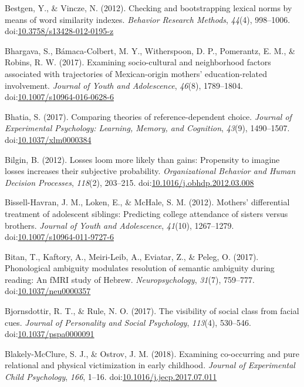 \documentclass[english,man]{apa6}
\theoremstyle{definition}
\theoremstyle{definition}
\theoremstyle{definition}
\theoremstyle{remark}
\begin{document}
\hypertarget{ref-Bestgen2012}{}
Bestgen, Y., \& Vincze, N. (2012). Checking and bootstrapping lexical
norms by means of word similarity indexes. \emph{Behavior Research
Methods}, \emph{44}(4), 998--1006.
doi:\href{https://doi.org/10.3758/s13428-012-0195-z}{10.3758/s13428-012-0195-z}

\hypertarget{ref-Bhargava2017}{}
Bhargava, S., Bámaca-Colbert, M. Y., Witherspoon, D. P., Pomerantz, E.
M., \& Robins, R. W. (2017). Examining socio-cultural and neighborhood
factors associated with trajectories of Mexican-origin mothers'
education-related involvement. \emph{Journal of Youth and Adolescence},
\emph{46}(8), 1789--1804.
doi:\href{https://doi.org/10.1007/s10964-016-0628-6}{10.1007/s10964-016-0628-6}

\hypertarget{ref-Bhatia2017}{}
Bhatia, S. (2017). Comparing theories of reference-dependent choice.
\emph{Journal of Experimental Psychology: Learning, Memory, and
Cognition}, \emph{43}(9), 1490--1507.
doi:\href{https://doi.org/10.1037/xlm0000384}{10.1037/xlm0000384}

\hypertarget{ref-Bilgin2012}{}
Bilgin, B. (2012). Losses loom more likely than gains: Propensity to
imagine losses increases their subjective probability.
\emph{Organizational Behavior and Human Decision Processes},
\emph{118}(2), 203--215.
doi:\href{https://doi.org/10.1016/j.obhdp.2012.03.008}{10.1016/j.obhdp.2012.03.008}

\hypertarget{ref-Bissell-Havran2012}{}
Bissell-Havran, J. M., Loken, E., \& McHale, S. M. (2012). Mothers'
differential treatment of adolescent siblings: Predicting college
attendance of sisters versus brothers. \emph{Journal of Youth and
Adolescence}, \emph{41}(10), 1267--1279.
doi:\href{https://doi.org/10.1007/s10964-011-9727-6}{10.1007/s10964-011-9727-6}

\hypertarget{ref-Bitan2017}{}
Bitan, T., Kaftory, A., Meiri-Leib, A., Eviatar, Z., \& Peleg, O.
(2017). Phonological ambiguity modulates resolution of semantic
ambiguity during reading: An fMRI study of Hebrew.
\emph{Neuropsychology}, \emph{31}(7), 759--777.
doi:\href{https://doi.org/10.1037/neu0000357}{10.1037/neu0000357}

\hypertarget{ref-Bjornsdottir2017}{}
Bjornsdottir, R. T., \& Rule, N. O. (2017). The visibility of social
class from facial cues. \emph{Journal of Personality and Social
Psychology}, \emph{113}(4), 530--546.
doi:\href{https://doi.org/10.1037/pspa0000091}{10.1037/pspa0000091}

\hypertarget{ref-Blakely-McClure2018}{}
Blakely-McClure, S. J., \& Ostrov, J. M. (2018). Examining co-occurring
and pure relational and physical victimization in early childhood.
\emph{Journal of Experimental Child Psychology}, \emph{166}, 1--16.
doi:\href{https://doi.org/10.1016/j.jecp.2017.07.011}{10.1016/j.jecp.2017.07.011}
\end{document}
